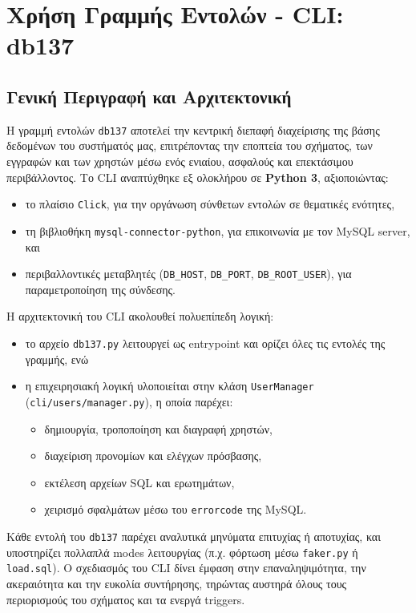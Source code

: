 \documentclass[13pt]{extarticle}
\begin{document}
\clearpage
\section{Χρήση Γραμμής Εντολών - CLI: db137}

\subsection{Γενική Περιγραφή και Αρχιτεκτονική}

Η γραμμή εντολών \texttt{db137} αποτελεί την κεντρική διεπαφή διαχείρισης της βάσης δεδομένων του συστήματός μας, επιτρέποντας την εποπτεία του σχήματος, των εγγραφών και των χρηστών μέσω ενός ενιαίου, ασφαλούς και επεκτάσιμου περιβάλλοντος. Το CLI αναπτύχθηκε εξ ολοκλήρου σε \textbf{Python 3}, αξιοποιώντας:
\begin{itemize}
  \item το πλαίσιο \texttt{Click}, για την οργάνωση σύνθετων εντολών σε θεματικές ενότητες,
  \item τη βιβλιοθήκη \texttt{mysql-connector-python}, για επικοινωνία με τον MySQL server, και
  \item περιβαλλοντικές μεταβλητές (\texttt{DB\_HOST}, \texttt{DB\_PORT}, \texttt{DB\_ROOT\_USER}), για παραμετροποίηση της σύνδεσης.
\end{itemize}

Η αρχιτεκτονική του CLI ακολουθεί πολυεπίπεδη λογική:
\begin{itemize}
  \item το αρχείο \texttt{db137.py} λειτουργεί ως entrypoint και ορίζει όλες τις εντολές της γραμμής, ενώ
  \item η επιχειρησιακή λογική υλοποιείται στην κλάση \texttt{UserManager} (\texttt{cli/users/manager.py}), η οποία παρέχει:
  \begin{itemize}
    \item δημιουργία, τροποποίηση και διαγραφή χρηστών,
    \item διαχείριση προνομίων και ελέγχων πρόσβασης,
    \item εκτέλεση αρχείων SQL και ερωτημάτων,
    \item χειρισμό σφαλμάτων μέσω του \texttt{errorcode} της MySQL.
  \end{itemize}
\end{itemize}

Κάθε εντολή του \texttt{db137} παρέχει αναλυτικά μηνύματα επιτυχίας ή αποτυχίας, και υποστηρίζει πολλαπλά modes λειτουργίας (π.χ. φόρτωση μέσω \texttt{faker.py} ή \texttt{load.sql}). Ο σχεδιασμός του CLI δίνει έμφαση στην επαναληψιμότητα, την ακεραιότητα και την ευκολία συντήρησης, τηρώντας αυστηρά όλους τους περιορισμούς του σχήματος και τα ενεργά triggers.\\
\end{document}
